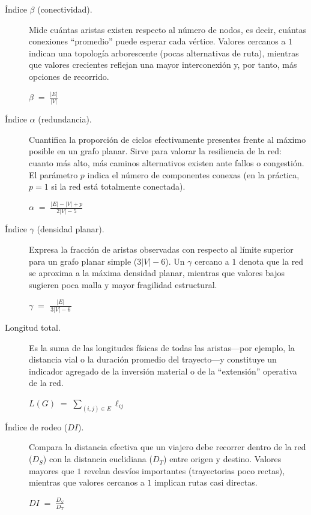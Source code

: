 \documentclass[11pt]{article}
\begin{document}
		\begin{description}

		\item[Índice $\beta$ (conectividad).]
		Mide cuántas aristas existen respecto al número de nodos, es decir, cuántas conexiones “promedio” puede esperar cada vértice. Valores cercanos a $1$ indican una topología arborescente (pocas alternativas de ruta), mientras que valores crecientes reflejan una mayor interconexión y, por tanto, más opciones de recorrido.
		\begin{center}
		$\displaystyle \beta \;=\; \frac{|E|}{|V|}$
		\end{center}

		\item[Índice $\alpha$ (redundancia).]
		Cuantifica la proporción de ciclos efectivamente presentes frente al máximo posible en un grafo planar. Sirve para valorar la resiliencia de la red: cuanto más alto, más caminos alternativos existen ante fallos o congestión. El parámetro $p$ indica el número de componentes conexas (en la práctica, $p=1$ si la red está totalmente conectada).
		\begin{center}
		$\displaystyle \alpha \;=\; \frac{|E| - |V| + p}{\,2|V| - 5\,}$
		\end{center}

		\item[Índice $\gamma$ (densidad planar).]
		Expresa la fracción de aristas observadas con respecto al límite superior para un grafo planar simple ($3|V|-6$). Un $\gamma$ cercano a $1$ denota que la red se aproxima a la máxima densidad planar, mientras que valores bajos sugieren poca malla y mayor fragilidad estructural.
		\begin{center}
		$\displaystyle \gamma \;=\; \frac{|E|}{\,3|V| - 6\,}$
		\end{center}

		\item[Longitud total.]
		Es la suma de las longitudes físicas de todas las aristas—por ejemplo, la distancia vial o la duración promedio del trayecto—y constituye un indicador agregado de la inversión material o de la “extensión” operativa de la red.
		\begin{center}
		$\displaystyle L(G) \;=\; \sum_{(i,j)\in E} \ell_{ij}$
		\end{center}

		\item[Índice de rodeo ($DI$).]
		Compara la distancia efectiva que un viajero debe recorrer dentro de la red ($D_S$) con la distancia euclidiana ($D_T$) entre origen y destino. Valores mayores que $1$ revelan desvíos importantes (trayectorias poco rectas), mientras que valores cercanos a $1$ implican rutas casi directas.
		\begin{center}
		$\displaystyle DI \;=\; \frac{D_S}{D_T}$
		\end{center}


\end{description}
\end{document}
